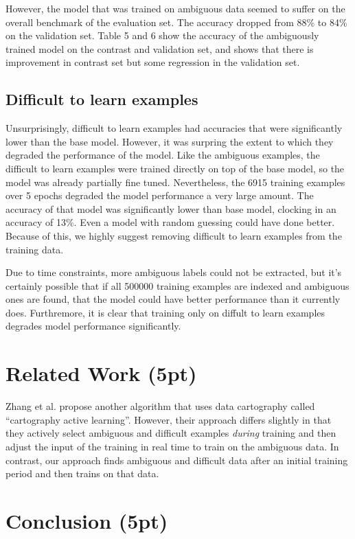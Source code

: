 \documentclass[twocolumn]{article}
\begin{document}
However, the model that was trained on ambiguous data seemed to suffer on the
overall benchmark of the evaluation set. The accuracy dropped from 88\% to 84\%
on the validation set. Table 5 and 6 show the accuracy of the ambiguously
trained model on the contrast and validation set, and shows that there is
improvement in contrast set but some regression in the validation set.

\subsection{Difficult to learn examples}

Unsurprisingly, difficult to learn examples had accuracies that were
significantly lower than the base model. However, it was surpring the extent to
which they degraded the performance of the model. Like the ambiguous examples,
the difficult to learn examples were trained directly on top of the base model,
so the model was already partially fine tuned. Nevertheless, the 6915 training
examples over 5 epochs degraded the model performance a very large amount. The
accuracy of that model was significantly lower than base model, clocking in an
accuracy of 13\%. Even a model with random guessing could have done better.
Because of this, we highly suggest removing difficult to learn examples from the
training data. 

Due to time constraints, more ambiguous labels could not be extracted, but it's
certainly possible that if all 500000 training examples are indexed and
ambiguous ones are found, that the model could have better performance than it
currently does. Furthremore, it is clear that training only on diffult to learn
examples degrades model performance significantly.

 \section{Related Work (5pt)}
Zhang et al. \cite{zhang2022cartography} propose another algorithm that uses
data cartography called \enquote{cartography active learning}. However, their
approach differs slightly in that they actively select ambiguous and difficult
examples \textit{during} training and then adjust the input of the training in
real time to train on the ambiguous data. In contrast, our approach finds
ambiguous and difficult data after an initial training period and then trains on
that data.

\section{Conclusion (5pt)}
\end{document}
